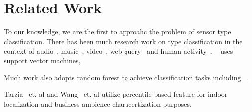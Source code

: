 \section{Related Work}
To our knowledge, we are the first to approahc the problem of sensor type classification. There has been much research work on type classification 
in the context of audio~\cite{audio1,audio2}, music~\cite{music1,music2}, video~\cite{video1,video2}, web query~\cite{query1,query2} and human 
activity~\cite{activity1, activity2}. ~\cite{audio1} uses support vector machines, 

Much work also adopts random forest to achieve classification tasks including ~\cite{RF1,RF2,RF3,cvpr}.

Tarzia~\cite{ABS} et. al and Wang~\cite{business} et. al utilize percentile-based feature for indoor localization and business ambience characertization purposes.
